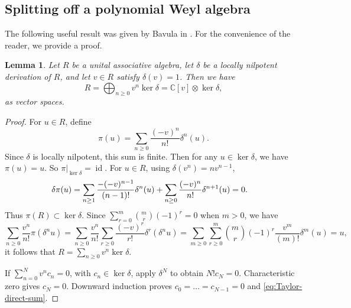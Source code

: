 \documentclass[12pt,a4paper]{amsart}
\numberwithin{equation}{section}
\newtheorem{lemma}[theorem]{Lemma}
\theoremstyle{definition}
\theoremstyle{remark}
\newcommand{\C}{\mathbb{C}}
\newcommand{\id}{\operatorname{id}}
\begin{document}
\subsection{Splitting off a polynomial Weyl algebra}
\label{ssec:Weyl}

The following useful result was given by Bavula in \cite{Ba}.
For the convenience of the reader, we provide a proof.

\begin{lemma}\cite[Theorem~2.3]{Ba}\label{lem:Weyl}
Let \(R\) be a unital associative algebra, let \(\delta\) be a locally nilpotent
derivation of \(R\), and let \(v\in R\) satisfy \(\delta(v)=1\).
Then we have
\begin{equation}\label{eq:Taylor-direct-sum}
 R=\bigoplus_{n\geq0}v^n\ker\delta=\C[v]\otimes \ker\delta,
\end{equation}
as vector spaces.
\end{lemma}

\begin{proof}
For $u\in R$, define
\begin{equation}\label{eq:projection}
 \pi(u)=\sum_{n\geq0}\frac{(-v)^n}{n!}\delta^n(u).
\end{equation}
Since $\delta$ is locally nilpotent, this sum is finite.
Then for any $u\in \ker\delta$, we have $\pi(u)=u$. So
\(\pi|_{\ker\delta}=\id\). For $u\in R$, using \(\delta(v^n)=nv^{n-1}\),
\begin{equation}\label{eq:ker}\aligned \delta\pi(u)
&=\sum_{n\geq 1}\frac{-(-v)^{n-1}}{(n-1)!}\delta^n(u)
+\sum_{n\geq0}\frac{(-v)^n}{n!}\delta^{n+1}(u)=0.
\endaligned\end{equation}
Thus \(\pi(R)\subset\ker\delta\).
Since $\sum_{r=0}^{m}\binom{m}{r}(-1)^r=0$ when $m>0$, we have
\begin{equation}\label{eq:inversion}
 \sum_{n\geq0}\frac{v^n}{n!}\pi(\delta^n u)
 =\sum_{n\geq0}\frac{v^n}{n!}
 \sum_{r\geq0}\frac{(-v)^r}{r!}\delta^r(\delta^n u)
 =\sum_{m\geq0} \sum_{r\geq0}^{m}\binom{m}{r}(-1)^r\frac{v^{m}}{(m)!}
\delta^{m}( u)=u,
\end{equation}
it follows that  $R=\sum_{n\geq0}v^n\ker\delta$.


If \(\sum_{n=0}^{N}v^n c_n=0\), with \(c_n\in\ker\delta\),
apply \(\delta^N\) to obtain \(N!c_N=0\).
Characteristic zero gives \(c_N=0\). Downward induction proves
$c_0=\dots=c_{N-1}=0$ and
\eqref{eq:Taylor-direct-sum}.
\end{proof}
\end{document}
